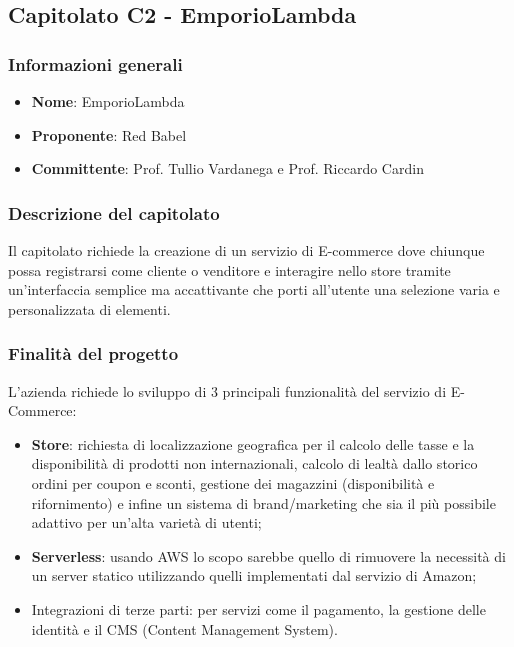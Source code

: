 				
	\subsection{Capitolato C2 - EmporioLambda}
		\subsubsection{Informazioni generali}
			\begin{itemize}
				\item\textbf{Nome}: EmporioLambda
				\item\textbf{Proponente}: Red Babel
				\item\textbf{Committente}: Prof. Tullio Vardanega e Prof. Riccardo Cardin
			\end{itemize}
			
		\subsubsection{Descrizione del capitolato}
			Il capitolato richiede la creazione di un servizio di E-commerce dove chiunque possa registrarsi come cliente o venditore e interagire nello store tramite un’interfaccia semplice ma accattivante che porti all’utente una selezione varia e personalizzata di elementi.
		\subsubsection{Finalità del progetto}
			L’azienda richiede lo sviluppo di 3 principali funzionalità del servizio di E-Commerce:
			\begin{itemize}
				\item\textbf{Store}: richiesta di localizzazione geografica per il calcolo delle tasse e la disponibilità di prodotti non internazionali, calcolo di lealtà dallo storico ordini per coupon e sconti, gestione dei magazzini (disponibilità e rifornimento) e infine un sistema di brand/marketing che sia il più possibile adattivo per un'alta varietà di utenti;
				\item\textbf{Serverless}: usando AWS lo scopo sarebbe quello di rimuovere la necessità di un server statico utilizzando quelli implementati dal servizio di Amazon;
				\item Integrazioni di terze parti: per servizi come il pagamento, la gestione delle identità e il CMS (Content Management System).
			\end{itemize}
